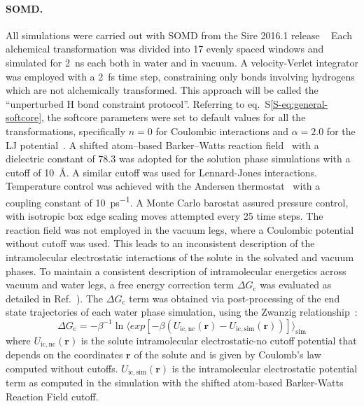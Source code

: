 \documentclass[journal=jctcce,manuscript=article]{achemso}
\begin{document}
\paragraph{SOMD.} All simulations were carried out with
SOMD from the Sire 2016.1 release ~\cite{Sire-2016, doi:10.1021/ct300857j}
Each alchemical transformation was
divided into 17 evenly spaced windows and simulated for \SI{2}{ns}
each both in water and in vacuum. A velocity-Verlet integrator was
employed with a \SI{2}{fs} time step, constraining only bonds involving hydrogens which are not alchemically transformed.  This approach will be called the ``unperturbed H bond constraint protocol''. Referring to eq.~S\ref{S-eq:general-softcore}, the softcore parameters were set to default values for all the transformations, specifically $n = 0$ for Coulombic interactions and $\alpha = 2.0$ for the LJ potential~\cite{doi:10.1021/ct700081t}.  A shifted atom--based Barker--Watts reaction field~\cite{doi:10.1080/00268977300102101} with
a dielectric constant of \num{78.3} was adopted for the solution phase
simulations with a cutoff of \SI{10}{\angstrom}. A similar cutoff was used for 
Lennard-Jones interactions. Temperature control was achieved with the Andersen
thermostat~\cite{doi:10.1063/1.439486} with a coupling constant of
\SI{10}{ps^{-1}}.  A Monte Carlo barostat assured pressure control,
with isotropic box edge scaling moves attempted every 25 time steps.
The reaction field was not employed in the vacuum legs, where a Coulombic 
potential without cutoff was used.  This leads to an inconsistent description of the intramolecular electrostatic interactions of the solute in the solvated and vacuum phases.   To maintain a consistent description of intramolecular 
energetics across vacuum and water legs, a free energy correction term $\Delta G_{\mathrm{c}}$ was  evaluated as detailed in Ref.~).  The
$\Delta G_{\mathrm{c}}$ term was obtained via post-processing of the end state 
trajectories of each water phase simulation, using the Zwanzig 
relationship~\cite{zwanzig_high-temperature_1954}:
\begin{equation}
 \label{eq:ZwanzigDGfunc}
 \Delta G_{\mathrm{c}} = -\beta^{-1} \ln \langle exp 
 \left[-\beta(U_{\mathrm{ic,nc}}(\mathbf{r}) - 
 U_{\mathrm{ic,sim}}(\mathbf{r}))\right]\rangle_{\mathrm{sim}}
\end{equation}
where $U_{\mathrm{ic,nc}}(\mathbf{r})$ is the solute intramolecular 
electrostatic-no cutoff 
potential that depends on the coordinates $\mathbf{r}$ of the solute and is 
given by Coulomb's law computed without cutoffs. 
$U_{\mathrm{ic,sim}}(\mathbf{r})$ is the intramolecular electrostatic potential 
term as
computed in the simulation with the shifted atom-based Barker-Watts Reaction 
Field cutoff.
\end{document}
